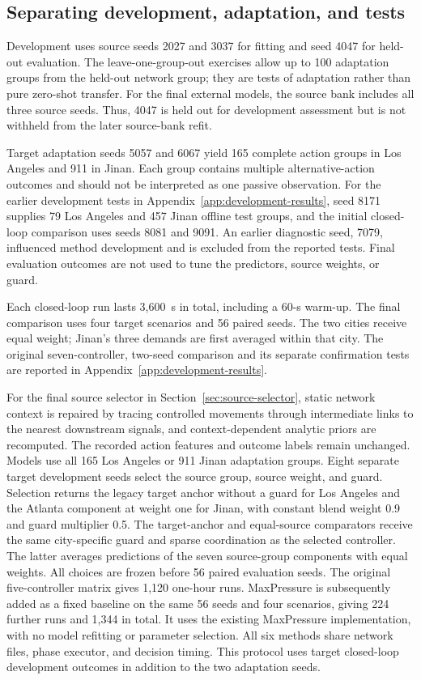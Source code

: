 \subsection{Separating development, adaptation, and tests}
Development uses source seeds 2027 and 3037 for fitting and seed 4047 for held-out evaluation. The leave-one-group-out exercises allow up to 100 adaptation groups from the held-out network group; they are tests of adaptation rather than pure zero-shot transfer. For the final external models, the source bank includes all three source seeds. Thus, 4047 is held out for development assessment but is not withheld from the later source-bank refit.

Target adaptation seeds 5057 and 6067 yield 165 complete action groups in Los Angeles and 911 in Jinan. Each group contains multiple alternative-action outcomes and should not be interpreted as one passive observation. For the earlier development tests in Appendix~\ref{app:development-results}, seed 8171 supplies 79 Los Angeles and 457 Jinan offline test groups, and the initial closed-loop comparison uses seeds 8081 and 9091. An earlier diagnostic seed, 7079, influenced method development and is excluded from the reported tests. Final evaluation outcomes are not used to tune the predictors, source weights, or guard.

Each closed-loop run lasts 3,600~s in total, including a 60-s warm-up. The final comparison uses four target scenarios and 56 paired seeds. The two cities receive equal weight; Jinan's three demands are first averaged within that city. The original seven-controller, two-seed comparison and its separate confirmation tests are reported in Appendix~\ref{app:development-results}.

For the final source selector in Section~\ref{sec:source-selector}, static network context is repaired by tracing controlled movements through intermediate links to the nearest downstream signals, and context-dependent analytic priors are recomputed. The recorded action features and outcome labels remain unchanged. Models use all 165 Los Angeles or 911 Jinan adaptation groups. Eight separate target development seeds select the source group, source weight, and guard. Selection returns the legacy target anchor without a guard for Los Angeles and the Atlanta component at weight one for Jinan, with constant blend weight 0.9 and guard multiplier 0.5. The target-anchor and equal-source comparators receive the same city-specific guard and sparse coordination as the selected controller. The latter averages predictions of the seven source-group components with equal weights. All choices are frozen before 56 paired evaluation seeds. The original five-controller matrix gives 1,120 one-hour runs. MaxPressure is subsequently added as a fixed baseline on the same 56 seeds and four scenarios, giving 224 further runs and 1,344 in total. It uses the existing MaxPressure implementation, with no model refitting or parameter selection. All six methods share network files, phase executor, and decision timing. This protocol uses target closed-loop development outcomes in addition to the two adaptation seeds.

